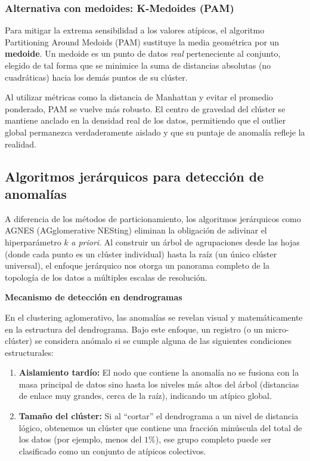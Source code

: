 \subsubsection{Alternativa con medoides: K-Medoides (PAM)}

Para mitigar la extrema sensibilidad a los valores atípicos, el algoritmo Partitioning Around Medoids (PAM) sustituye la media geométrica por un \textbf{medoide}. Un medoide es un punto de datos \textit{real} perteneciente al conjunto, elegido de tal forma que se minimice la suma de distancias absolutas (no cuadráticas) hacia los demás puntos de su clúster.

Al utilizar métricas como la distancia de Manhattan y evitar el promedio ponderado, PAM se vuelve más robusto. El centro de gravedad del clúster se mantiene anclado en la densidad real de los datos, permitiendo que el outlier global permanezca verdaderamente aislado y que su puntaje de anomalía refleje la realidad.

\subsection{Algoritmos jerárquicos para detección de anomalías}

A diferencia de los métodos de particionamiento, los algoritmos jerárquicos como AGNES (AGglomerative NESting) eliminan la obligación de adivinar el hiperparámetro $k$ \textit{a priori}. Al construir un árbol de agrupaciones desde las hojas (donde cada punto es un clúster individual) hasta la raíz (un único clúster universal), el enfoque jerárquico nos otorga un panorama completo de la topología de los datos a múltiples escalas de resolución.

\textbf{Mecanismo de detección en dendrogramas}

En el clustering aglomerativo, las anomalías se revelan visual y matemáticamente en la estructura del dendrograma. Bajo este enfoque, un registro (o un micro-clúster) se considera anómalo si se cumple alguna de las siguientes condiciones estructurales:

\begin{enumerate}
	\item \textbf{Aislamiento tardío:} El nodo que contiene la anomalía no se fusiona con la masa principal de datos sino hasta los niveles más altos del árbol (distancias de enlace muy grandes, cerca de la raíz), indicando un atípico global.
	
	\item \textbf{Tamaño del clúster:} Si al ``cortar'' el dendrograma a un nivel de distancia lógico, obtenemos un clúster que contiene una fracción minúscula del total de los datos (por ejemplo, menos del $1\%$), ese grupo completo puede ser clasificado como un conjunto de atípicos colectivos.
\end{enumerate}

